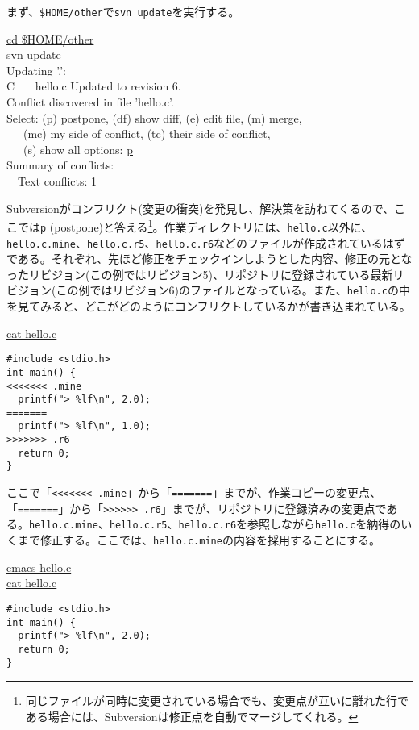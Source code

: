 まず、{\tt \$HOME/other}で{\tt svn update}を実行する。
\begin{commandline2}
\prompt \underline{cd \$HOME/other} \\
\prompt \underline{svn update} \\
Updating '.': \\
C \ \ \ hello.c
Updated to revision 6. \\
Conflict discovered in file 'hello.c'. \\
Select: (p) postpone, (df) show diff, (e) edit file, (m) merge, \\
\ \ \   (mc) my side of conflict, (tc) their side of conflict, \\
\ \ \   (s) show all options: \underline{p} \\
Summary of conflicts: \\
\ \ Text conflicts: 1
\end{commandline2} \noindent
Subversionがコンフリクト(変更の衝突)を発見し、解決策を訪ねてくるので、ここでは{\tt p} (postpone)と答える\footnote{同じファイルが同時に変更されている場合でも、変更点が互いに離れた行である場合には、Subversionは修正点を自動でマージしてくれる。}。作業ディレクトリには、{\tt hello.c}以外に、{\tt hello.c.mine}、{\tt hello.c.r5}、{\tt hello.c.r6}などのファイルが作成されているはずである。それぞれ、先ほど修正をチェックインしようとした内容、修正の元となったリビジョン(この例ではリビジョン5)、リポジトリに登録されている最新リビジョン(この例ではリビジョン6)のファイルとなっている。また、{\tt hello.c}の中を見てみると、どこがどのようにコンフリクトしているかが書き込まれている。
\begin{commandline2}
\prompt \underline{cat hello.c}
\vspace*{-.7em} 
\begin{verbatim}
#include <stdio.h>
int main() {
<<<<<<< .mine
  printf("> %lf\n", 2.0);
=======
  printf("> %lf\n", 1.0);
>>>>>>> .r6
  return 0;
}
\end{verbatim}
\end{commandline2} \noindent
ここで「\verb+<<<<<<< .mine+」から「\verb+=======+」までが、作業コピーの変更点、「\verb+=======+」から「\verb+>>>>>> .r6+」までが、リポジトリに登録済みの変更点である。{\tt hello.c.mine}、{\tt hello.c.r5}、{\tt hello.c.r6}を参照しながら{\tt hello.c}を納得のいくまで修正する。ここでは、{\tt hello.c.mine}の内容を採用することにする。
\begin{commandline2}
\prompt \underline{emacs hello.c} \\
\prompt \underline{cat hello.c}
\vspace*{-.7em} 
\begin{verbatim}
#include <stdio.h>
int main() {
  printf("> %lf\n", 2.0);
  return 0;
}
\end{verbatim}
\end{commandline2} \noindent
